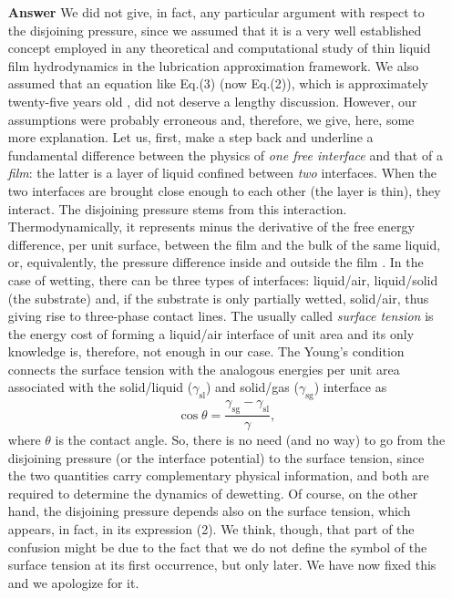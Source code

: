 \documentclass[12pt,english]{article}
\begin{document}
\begin{itemize}
\item[ \textbf{{Answer}}]
{
We did not give, in fact, any particular argument with respect to the disjoining pressure, since 
we assumed that it is a very well established concept employed in any theoretical and computational study of thin liquid film hydrodynamics in the lubrication approximation framework.
We also assumed that an equation like Eq.(3) (now Eq.(2)), which is approximately twenty-five years old \cite{SCHWARTZ1998173,Mitlin94}, did not deserve a lengthy discussion.
However, our assumptions were probably erroneous and, therefore, we give, here, some more explanation. 
Let us, first, make a step back and underline a fundamental difference between the physics of {\it one free interface} and that of a {\it film}:
the latter is a layer of liquid confined between {\it two} interfaces. When the two interfaces are brought close enough to each other (the layer is thin), they interact.
The disjoining pressure stems from this interaction. Thermodynamically, it represents minus the derivative of the free energy difference, per unit surface, between 
the film and the bulk of the same liquid, or, equivalently, the pressure difference inside and outside the film 
\cite{Deryaguin1940,DeryaguinChuraev1978}.
In the case of wetting, there can be three types of interfaces: liquid/air, liquid/solid (the substrate) and, 
if the substrate is only partially wetted, solid/air, thus giving rise to three-phase contact lines. 
The usually called {\it surface tension} is the energy cost of forming a liquid/air interface of unit area and its only knowledge is, therefore, not enough in our case. 
The Young's condition \cite{Young1805,DeGennes1985} connects the surface tension with the analogous energies per unit
area associated with the solid/liquid ($\gamma_{\text{sl}}$) and solid/gas ($\gamma_{\text{sg}}$) interface as
\begin{equation}
\cos \theta = \frac{\gamma_{\text{sg}}-\gamma_{\text{sl}}}{\gamma},
\end{equation}
where $\theta$ is the contact angle.
So, there is no need (and no way) to go from the disjoining pressure (or the interface potential) to the surface tension, since the two quantities carry complementary physical information,
and both are required to determine the dynamics of dewetting.
Of course, on the other hand, the disjoining pressure depends also on the surface tension, which appears, in fact, in its expression (2). 
We think, though, that part of the confusion might be due to the fact that we do not define the symbol of the surface tension at its first occurrence, but only later. 
We have now fixed this and we apologize for it.
}


\end{itemize}
\end{document}
